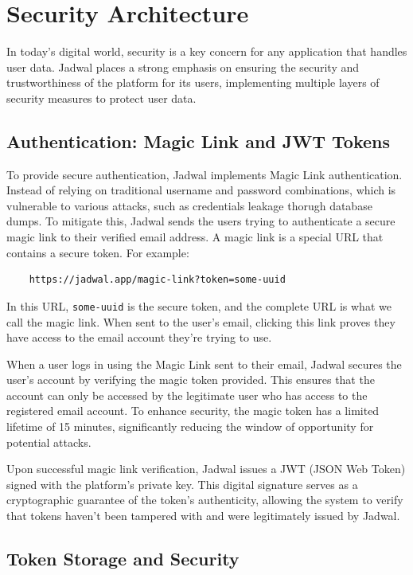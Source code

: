 \documentclass[12pt,a4paper]{report}
\begin{document}
\section{Security Architecture}

In today's digital world, security is a key concern for any application that handles user data. Jadwal places a strong emphasis on ensuring the security and trustworthiness of the platform for its users, implementing multiple layers of security measures to protect user data.

\subsection{Authentication: Magic Link and JWT Tokens}

To provide secure authentication, Jadwal implements Magic Link authentication. Instead of relying on traditional username and password combinations, which is vulnerable to various attacks, such as credentials leakage thorugh database dumps. To mitigate this, Jadwal sends the users trying to authenticate a secure magic link to their verified email address. A magic link is a special URL that contains a secure token. For example:

\begin{verbatim}
    https://jadwal.app/magic-link?token=some-uuid
\end{verbatim}

In this URL, \texttt{some-uuid} is the secure token, and the complete URL is what we call the magic link. When sent to the user's email, clicking this link proves they have access to the email account they're trying to use.

When a user logs in using the Magic Link sent to their email, Jadwal secures the user's account by verifying the magic token provided. This ensures that the account can only be accessed by the legitimate user who has access to the registered email account. To enhance security, the magic token has a limited lifetime of 15 minutes, significantly reducing the window of opportunity for potential attacks.

Upon successful magic link verification, Jadwal issues a JWT (JSON Web Token) signed with the platform's private key. This digital signature serves as a cryptographic guarantee of the token's authenticity, allowing the system to verify that tokens haven't been tampered with and were legitimately issued by Jadwal.

\subsection{Token Storage and Security}
\end{document}
